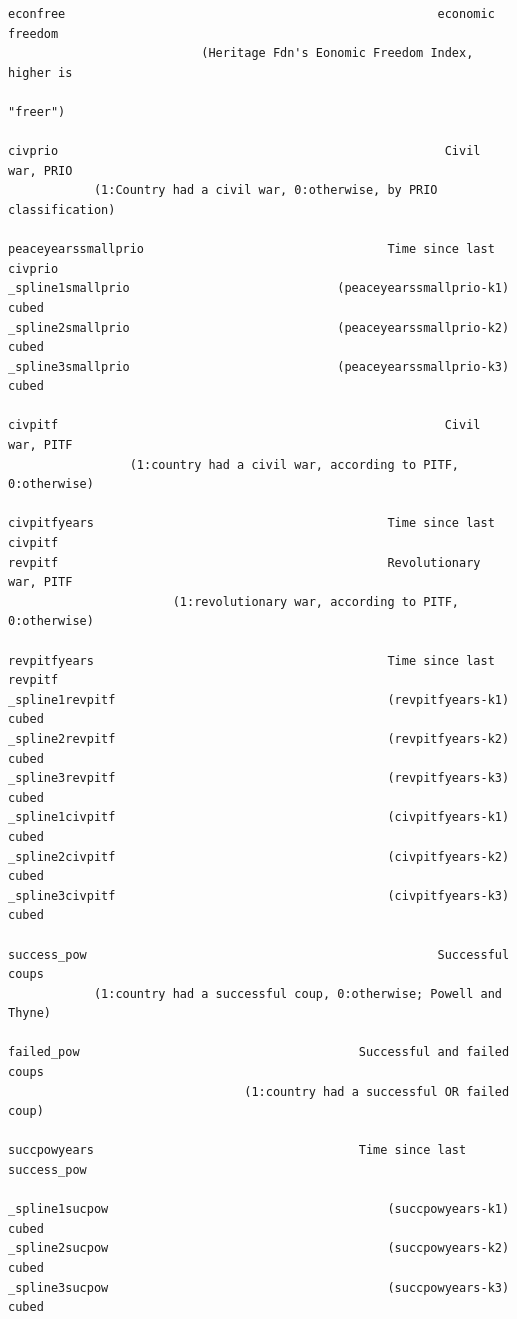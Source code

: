 \documentclass[12pt]{article}
\begin{document}
\begin{verbatim}
econfree                                                    economic freedom
                           (Heritage Fdn's Eonomic Freedom Index, higher is
                                                                    "freer")

civprio                                                      Civil war, PRIO
            (1:Country had a civil war, 0:otherwise, by PRIO classification)

peaceyearssmallprio                                  Time since last civprio
_spline1smallprio                             (peaceyearssmallprio-k1) cubed
_spline2smallprio                             (peaceyearssmallprio-k2) cubed
_spline3smallprio                             (peaceyearssmallprio-k3) cubed

civpitf                                                      Civil war, PITF
                 (1:country had a civil war, according to PITF, 0:otherwise)

civpitfyears                                         Time since last civpitf
revpitf                                              Revolutionary war, PITF
                       (1:revolutionary war, according to PITF, 0:otherwise)

revpitfyears                                         Time since last revpitf
_spline1revpitf                                      (revpitfyears-k1) cubed
_spline2revpitf                                      (revpitfyears-k2) cubed
_spline3revpitf                                      (revpitfyears-k3) cubed
_spline1civpitf                                      (civpitfyears-k1) cubed
_spline2civpitf                                      (civpitfyears-k2) cubed
_spline3civpitf                                      (civpitfyears-k3) cubed

success_pow                                                 Successful coups
            (1:country had a successful coup, 0:otherwise; Powell and Thyne)

failed_pow                                       Successful and failed coups
                                 (1:country had a successful OR failed coup)

succpowyears                                     Time since last success_pow

_spline1sucpow                                       (succpowyears-k1) cubed
_spline2sucpow                                       (succpowyears-k2) cubed
_spline3sucpow                                       (succpowyears-k3) cubed


\end{verbatim}
\end{document}
